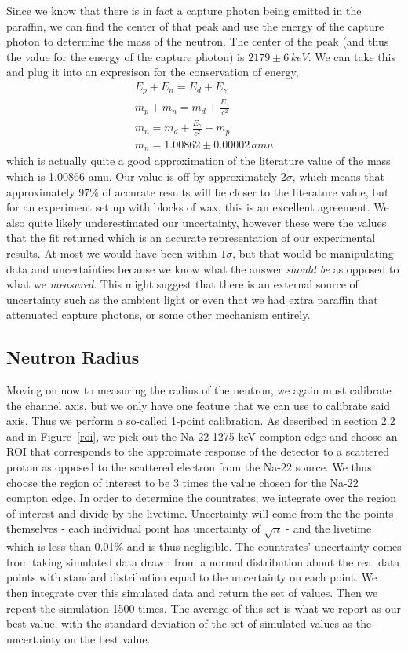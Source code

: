 \documentclass{article}
\begin{document}
  Since we know that there is in fact a capture photon being emitted in the paraffin, we can find the center of that peak and use the energy of the capture photon to determine the mass of the neutron.  The center of the peak (and thus the value for the energy of the capture photon) is $2179 \pm 6\, keV$.  We can take this and plug it into an expresison for the conservation of energy,
  \begin{gather*}
    E_p + E_n = E_d + E_\gamma \\
    m_p + m_n = m_d + \frac{E_\gamma}{c^2} \\
    m_n = m_d + \frac{E_\gamma}{c^2} - m_p \\
    m_n = 1.00862 \pm 0.00002 \, amu
  \end{gather*}
  which is actually quite a good approximation of the literature value of the mass which is 1.00866 amu.  Our value is off by approximately $2\sigma$, which means that approximately 97\% of accurate results will be closer to the literature value, but for an experiment set up with blocks of wax, this is an excellent agreement.  We also quite likely underestimated our uncertainty, however these were the values that the fit returned which is an accurate representation of our experimental results.  At most we would have been within $1\sigma$, but that would be manipulating data and uncertainties because we know what the answer \textit{should be} as opposed to what we \textit{measured}.  This might suggest that there is an external source of uncertainty such as the ambient light or even that we had extra paraffin that attenuated capture photons, or some other mechanism entirely.

  \subsection{Neutron Radius}
  Moving on now to measuring the radius of the neutron, we again must calibrate the channel axis, but we only have one feature that we can use to calibrate said axis.  Thus we perform a so-called 1-point calibration.  As described in section 2.2 and in Figure~\ref{roi}, we pick out the Na-22 1275 keV compton edge and choose an ROI that corresponds to the approimate response of the detector to a scattered proton as opposed to the scattered electron from the Na-22 source.  We thus choose the region of interest to be 3 times the value chosen for the Na-22 compton edge.  In order to determine the countrates, we integrate over the region of interest and divide by the livetime.  Uncertainty will come from the the points themselves - each individual point has uncertainty of $\sqrt{n}$ - and the livetime which is less than 0.01\% and is thus negligible.  The countrates' uncertainty comes from taking simulated data drawn from a normal distribution about the real data points with standard distribution equal to the uncertainty on each point.  We then integrate over this simulated data and return the set of values.  Then we repeat the simulation 1500 times.  The average of this set is what we report as our best value, with the standard deviation of the set of simulated values as the uncertainty on the best value.
\end{document}
